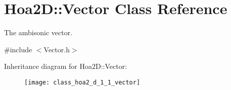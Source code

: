 \hypertarget{class_hoa2_d_1_1_vector}{\section{Hoa2\-D\-:\-:Vector Class Reference}
\label{class_hoa2_d_1_1_vector}
}


The ambisonic vector.  




{\ttfamily \#include $<$Vector.\-h$>$}

Inheritance diagram for Hoa2\-D\-:\-:Vector\-:\begin{figure}[H]
\begin{center}
\leavevmode
\texttt{[image: class\_hoa2\_d\_1\_1\_vector]}
\end{center}
\end{figure}
